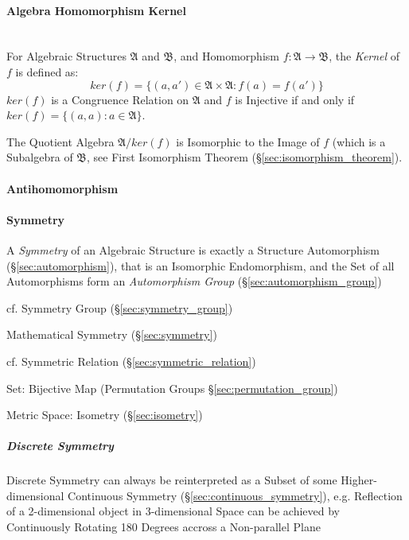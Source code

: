 \paragraph{Algebra Homomorphism Kernel}\hfill
\label{sec:algebra_homomorphism_kernel} \hfill \\

For Algebraic Structures $\mathfrak{A}$ and $\mathfrak{B}$, and Homomorphism
$f: \mathfrak{A} \rightarrow \mathfrak{B}$, the \emph{Kernel} of $f$ is defined
as:
\[
    ker(f) = \{ (a,a') \in \mathfrak{A} \times \mathfrak{A} : f(a) = f(a') \}
\]
$ker(f)$ is a Congruence Relation on $\mathfrak{A}$ and $f$ is Injective if and
only if $ker(f) = \{(a,a) : a \in \mathfrak{A}\}$.

The Quotient Algebra $\mathfrak{A}/ker(f)$ is Isomorphic to the Image of $f$
(which is a Subalgebra of $\mathfrak{B}$, see First Isomorphism Theorem
(\S\ref{sec:isomorphism_theorem}).



\paragraph{Antihomomorphism}\label{sec:antihomomorphism}\hfill

\paragraph{Symmetry}\label{sec:structure_symmetry}\hfill

A \emph{Symmetry} of an Algebraic Structure is exactly a Structure Automorphism
(\S\ref{sec:automorphism}), that is an Isomorphic Endomorphism, and the Set of
all Automorphisms form an \emph{Automorphism Group} (\S\ref{sec:automorphism_group})

cf. Symmetry Group (\S\ref{sec:symmetry_group})

\fist Mathematical Symmetry (\S\ref{sec:symmetry})

\fist cf. Symmetric Relation (\S\ref{sec:symmetric_relation})

Set: Bijective Map (Permutation Groups \S\ref{sec:permutation_group})

Metric Space: Isometry (\S\ref{sec:isometry})



\subparagraph{Discrete Symmetry}\label{sec:discrete_symmetry}\hfill

Discrete Symmetry can always be reinterpreted as a Subset of some
Higher-dimensional Continuous Symmetry (\S\ref{sec:continuous_symmetry}), e.g.
Reflection of a 2-dimensional object in 3-dimensional Space can be achieved by
Continuously Rotating 180 Degrees accross a Non-parallel Plane


